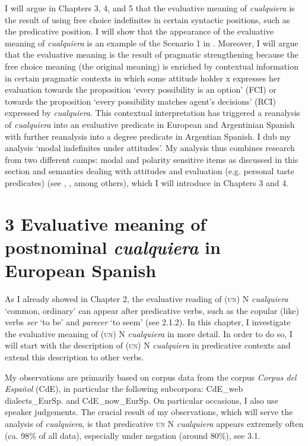 \documentclass[output=paper]{langscibook}
\begin{document}
  I will argue in Chapters 3, 4, and 5 that the evaluative meaning of \textit{cualquiera} is the result of using free choice indefinites in certain syntactic positions, such as the predicative position. I will show that the appearance of the evaluative meaning of \textit{cualquiera} is an example of the Scenario 1 in . Moreover, I will argue that the evaluative meaning is the result of pragmatic strengthening because the free choice meaning (the original meaning) is enriched by contextual information in certain pragmatic contexts in which some attitude holder x expresses her evaluation towards the proposition ‘every possibility is an option’ (FCI) or towards the proposition ‘every possibility matches agent’s decisions’ (RCI) expressed by \textit{cualquiera}. This contextual interpretation has triggered a reanalysis of \textit{cualquiera} into an evaluative predicate in European and Argentinian Spanish with further reanalysis into a degree predicate in Argentian Spanish. I dub my analysis ‘modal indefinites under attitudes’. My analysis thus combines research from two different camps: modal and polarity sensitive items as discussed in this section and semantics dealing with attitudes and evaluation (e.g. personal taste predicates) (see \citealt{Heim1992}, \citealt{Lasersohn2005}, among others), which I will introduce in Chapters 3 and 4.

\section{\textbf{3} \textbf{Evaluative} \textbf{meaning} \textbf{of} \textbf{postnominal} \textbf{\textit{cualquiera} }\textbf{in} \textbf{European} \textbf{Spanish}}

As I already showed in Chapter 2, the evaluative reading of (\textsc{un)} N \textit{cualquiera} ‘common, ordinary’ can appear after predicative verbs, such as the copular (like) verbs \textit{ser} ‘to be’ and \textit{parecer} ‘to seem’ (see 2.1.2). In this chapter, I investigate the evaluative meaning of (\textsc{un)} N \textit{cualquiera} in more detail. In order to do so, I will start with the description of (\textsc{un)} N \textit{cualquiera} in predicative contexts and extend this description to other verbs.

  My observations are primarily based on corpus data from the corpus \textit{Corpus del Español} (CdE), in particular the following subcorpora: CdE\_web dialects\_EurSp. and CdE\_now\_EurSp. On particular occasions, I also use speaker judgements. The crucial result of my observations, which will serve the analysis of \textit{cualquiera}, is that predicative \textsc{un} N \textit{cualquiera} appears extremely often (ca. 98\% of all data), especially under negation (around 80\%), see 3.1.
\end{document}
